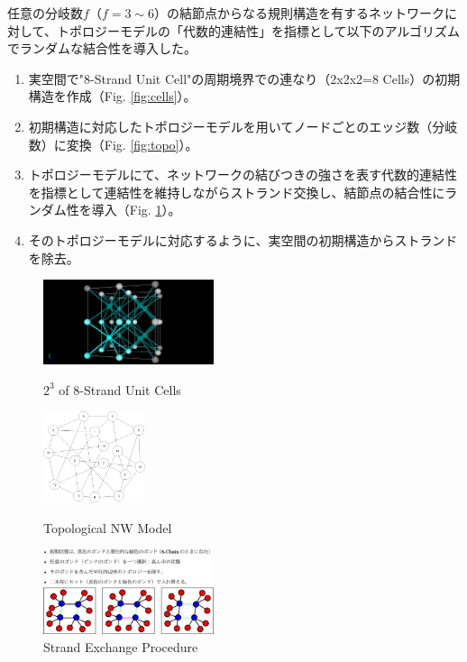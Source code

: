 \documentclass[uplatex,dvipdfmx,a4paper,11pt]{jsarticle}
\begin{document}
任意の分岐数$f$（$f=3\sim6$）の結節点からなる規則構造を有するネットワークに対して、トポロジーモデルの「代数的連結性」を指標として以下のアルゴリズムでランダムな結合性を導入した。
\begin{enumerate}
\item
実空間で"8-Strand Unit Cell"の周期境界での連なり（2x2x2=8 Cells）の初期構造を作成（Fig. \ref{fig:cells}）。
\item
初期構造に対応したトポロジーモデルを用いてノードごとのエッジ数（分岐数）に変換（Fig. \ref{fig:topo}）。
\item
トポロジーモデルにて、ネットワークの結びつきの強さを表す代数的連結性を指標として連結性を維持しながらストランド交換し、結節点の結合性にランダム性を導入（Fig. \ref{fig:exc}）。
\item
そのトポロジーモデルに対応するように、実空間の初期構造からストランドを除去。
\end{enumerate}

\begin{figure}[hb]
\begin{minipage}{0.33\hsize}
	\begin{center}
	\includegraphics[width=50mm]{8_per.png}
	\caption{$2^3$ of 8-Strand Unit Cells}
	\label{fig:cells}
	\end{center}
\end{minipage}
\begin{minipage}{0.33\hsize}
	\begin{center}
	\includegraphics[width=30mm]{Network.png}
	\caption{Topological NW Model}
	\label{fig:topo}
	\end{center}
\end{minipage}
\begin{minipage}{0.33\hsize}
	\begin{center}
	\includegraphics[width=50mm]{bond_exchg.png}
	\caption{Strand Exchange Procedure}
	\label{fig:exc}
	\end{center}
\end{minipage}
\end{figure}
\end{document}
